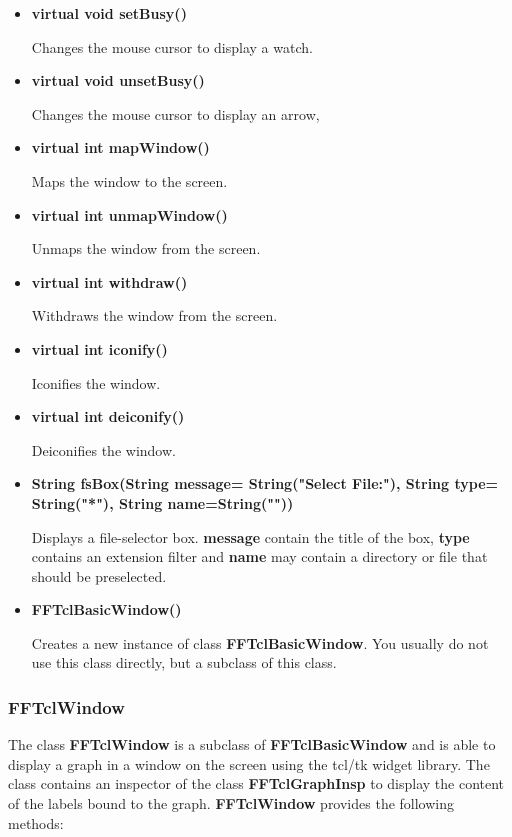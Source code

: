 \begin{itemize}
Sets the title of the window to {\bf s}.

\item{\bf virtual void setBusy()}

Changes the mouse cursor to display a watch.

\item{\bf virtual void unsetBusy()}

Changes the mouse cursor to display an arrow,

\item{\bf virtual int mapWindow()}

Maps the window to the screen.

\item{\bf virtual int unmapWindow()}

Unmaps the window from the screen.

\item{\bf virtual int withdraw()}

Withdraws the window from the screen.

\item{\bf virtual int iconify()}

Iconifies the window.

\item{\bf virtual int deiconify()}

Deiconifies the window.

\item{\bf String fsBox(String message= String("Select File:"), 
               String type= String("*"), String name=String(""))}

Displays a file-selector box. {\bf message} contain the title of the
box, {\bf type} contains an extension filter and {\bf name} may
contain a directory or file that should be preselected.

\item{\bf FFTclBasicWindow()}

Creates a new instance of class {\bf FFTclBasicWindow}. You usually
do not use this class directly, but a subclass of this class.

\end{itemize}

\subsubsection{FFTclWindow}

The class {\bf FFTclWindow} is a subclass of {\bf FFTclBasicWindow}
and is able to display a graph in a window on the screen using the
tcl/tk widget library. The class contains an inspector of the class
{\bf FFTclGraphInsp} to display the content of the labels bound to the
graph. {\bf FFTclWindow} provides the following methods:


